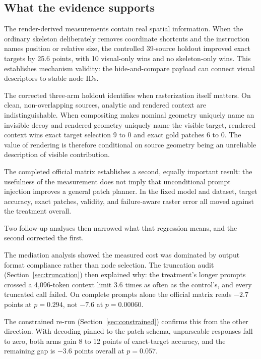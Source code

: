\documentclass[10pt,a4paper]{article}
\begin{document}
\subsection{What the evidence supports}

The render-derived measurements contain real spatial information. When the
ordinary skeleton deliberately removes coordinate shortcuts and the instruction
names position or relative size, the controlled 39-source holdout improved
exact targets by 25.6 points, with 10 visual-only wins and no skeleton-only
wins. This establishes mechanism validity: the hide-and-compare payload can
connect visual descriptors to stable node IDs.

The corrected three-arm holdout identifies when rasterization itself matters.
On clean, non-overlapping sources, analytic and rendered context are
indistinguishable. When compositing makes nominal geometry uniquely name an
invisible decoy and rendered geometry uniquely name the visible target,
rendered context wins exact target selection 9 to 0 and exact gold patches
6 to 0. The value of rendering is therefore conditional on source geometry
being an unreliable description of visible contribution.

The completed official matrix establishes a second, equally important result:
the usefulness of the measurement does not imply that unconditional prompt
injection improves a general patch planner. In the fixed model and dataset,
target accuracy, exact patches, validity, and failure-aware raster error all
moved against the treatment overall.

Two follow-up analyses then narrowed what that regression means, and the
second corrected the first.

The mediation analysis showed the measured cost was dominated by output
format compliance rather than node selection. The truncation audit
(Section~\ref{sec:truncation}) then explained why: the treatment's longer
prompts crossed a 4{,}096-token context limit 3.6 times as often as the
control's, and every truncated call failed. On complete prompts alone the
official matrix reads \(-2.7\) points at \(p=0.294\), not \(-7.6\) at
\(p=0.00060\).

The constrained re-run (Section~\ref{sec:constrained}) confirms this from the
other direction. With decoding pinned to the patch schema, unparseable
responses fall to zero, both arms gain 8 to 12 points of exact-target
accuracy, and the remaining gap is \(-3.6\) points overall at \(p=0.057\).
\end{document}
